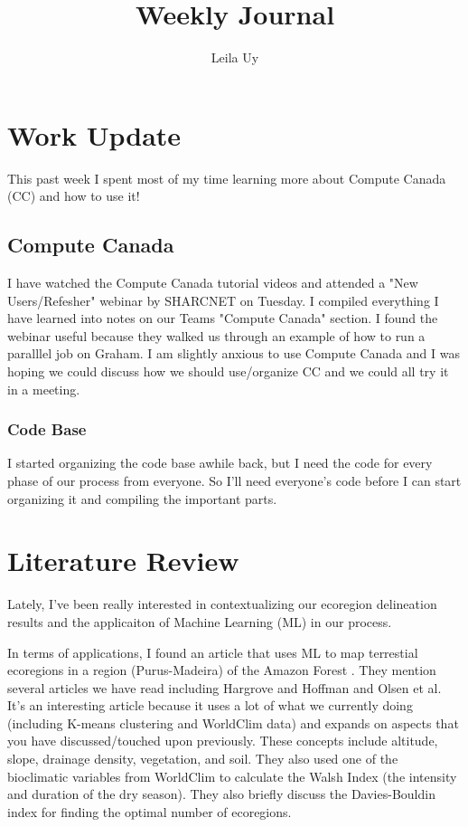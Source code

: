 \documentclass[a4paper,10pt]{article}
\title{Weekly Journal}
\author{Leila Uy}
\begin{document}
\maketitle

% 

\section{Work Update}

This past week I spent most of my time learning more about Compute Canada (CC) and how to use it!

\subsection{Compute Canada}
I have watched the Compute Canada tutorial videos and attended a "New Users/Refesher" webinar by SHARCNET on Tuesday. I compiled everything I have learned into notes on our Teams "Compute Canada" section. I found the webinar useful because they walked us through an example of how to run a paralllel job on Graham. I am slightly anxious to use Compute Canada and I was hoping we could discuss how we should use/organize CC and we could all try it in a meeting.

\subsubsection{Code Base}
I started organizing the code base awhile back, but I need the code for every phase of our process from everyone. So I'll need everyone's code before I can start organizing it and compiling the important parts.

\section{Literature Review}

Lately, I've been really interested in contextualizing our ecoregion delineation results and the applicaiton of Machine Learning (ML) in our process. 

In terms of applications, I found an article that uses ML to map terrestial ecoregions in a region (Purus-Madeira) of the Amazon Forest \cite{ximenes2021mapping}. They mention several articles we have read including Hargrove and Hoffman and Olsen et al. It's an interesting article because it uses a lot of what we currently doing (including K-means clustering and WorldClim data) and expands on aspects that you have discussed/touched upon previously. These concepts include altitude, slope, drainage density, vegetation, and soil. They also used one of the bioclimatic variables from WorldClim to calculate the Walsh Index (the intensity and duration of the dry season). They also briefly discuss the Davies-Bouldin index for finding the optimal number of ecoregions.
\end{document}
